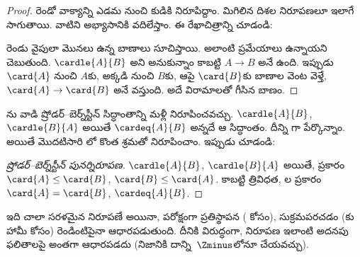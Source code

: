 \documentclass[../../../include/open-logic-section]{subfiles}
\begin{document}
\begin{proof}
రెండో వాక్యాన్ని ఎడమ నుంచి కుడికి నిరూపిద్దాం. మిగిలిన దిశల నిరూపణలూ ఇలాగే సాగుతాయి. వాటిని అభ్యాసానికి వదిలేస్తాం. ఈ రేఖాచిత్రాన్ని చూడండి:
\begin{center}
\end{center}
రెండు వైపులా మొనలు ఉన్న బాణాలు 
సూచిస్తాయి. అలాంటి ప్రమేయాలు ఉన్నాయని
 చెబుతుంది. $\cardle{A}{B}$ అని
అనుకున్నాం కాబట్టి $A\to B$ అనే 
ఉంది. ఇప్పుడు $\card{A}$ నుంచి $A$కు, అక్కడి నుంచి $B$కు,
ఆపై $\card{B}$కు బాణాల వెంట వెళ్తే, $\card{A} \to \card{B}$
అనే  వస్తుంది.
అదే విరామాలతో గీసిన బాణం.
\end{proof}\noindent {}ను వాడి ష్రోడర్--బెర్న్‌స్టీన్ సిద్ధాంతాన్ని మళ్లీ నిరూపించవచ్చు. $\cardle{A}{B}$, $\cardle{B}{A}$ అయితే $\cardeq{A}{B}$ అన్నదే ఆ సిద్ధాంతం. దీన్ని గా పేర్కొన్నాం. అయితే మొదటిసారి లో కొంత శ్రమతో నిరూపించాం. ఇప్పుడు చూడండి:

\begin{proof}[ష్రోడర్--బెర్న్‌స్టీన్ పునర్నిరూపణ]
$\cardle{A}{B}$, $\cardle{B}{A}$ అయితే,  ప్రకారం $\card{A} \leq \card{B}$, $\card{B} \leq \card{A}$. కాబట్టి త్రివిధత, ల ప్రకారం $\card{A} = \card{B}$, $\cardeq{A}{B}$.
\end{proof}
\noindent
ఇది చాలా సరళమైన నిరూపణే అయినా, పరోక్షంగా ప్రతిస్థాపన ( కోసం), సుక్రమపరచడం (కు హామీ కోసం) రెండింటిపైనా ఆధారపడుతుంది. దీనికి విరుద్ధంగా,  నిరూపణ ఇలాంటి అదనపు ఫలితాలపై అంతగా ఆధారపడదు (నిజానికి దాన్ని~$\Zminus$లోనూ చేయవచ్చు).
\end{document}
